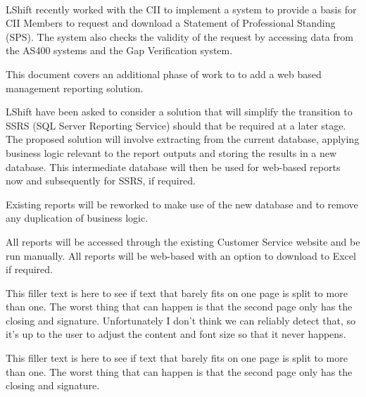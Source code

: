 \documentclass[10pt, a4paper, parskip=half,
               enlargefirstpage, pagenumber=no]{scrlttr2}
\begin{document}

\begin{letter}{%
\tystrrecipient \\
\tystrrecipientaddress
}
\opening{\tystropening}
LShift recently worked with the CII to implement a system to provide a basis for CII Members to request and download a Statement of Professional Standing (SPS). The system also checks the validity of the request by accessing data from the AS400 systems and the Gap Verification system.

This document covers an additional phase of work to to add a web based management reporting solution.

LShift have been asked to consider a solution that will simplify the transition to SSRS (SQL Server Reporting Service) should that be required at a later stage. The proposed solution will involve extracting from the current database, applying business logic relevant to the report outputs and storing the results in a new database. This intermediate database will then be used for web-based reports now and subsequently for SSRS, if required. 

Existing reports will be reworked to make use of the new database and to remove any duplication of business logic. 

All reports will be accessed through the existing Customer Service website and be run manually. All reports will be web-based with an option to download to Excel if required.

This filler text is here to see if text that barely fits on one page is split to more than one. The worst thing that can happen is that the second page only has the closing and signature. Unfortunately I don’t think we can reliably detect that, so it’s up to the user to adjust the content and font size so that it never happens.

This filler text is here to see if text that barely fits on one page is split to more than one. The worst thing that can happen is that the second page only has the closing and signature. 


\closing{\tystrclosing}
\end{letter}
\end{document}
